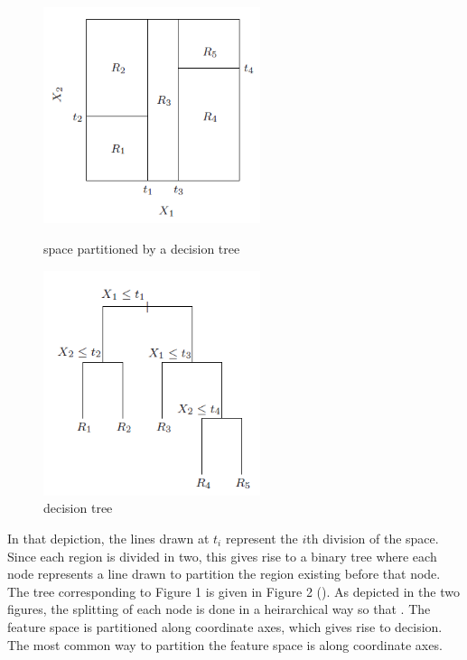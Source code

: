 \documentclass[12pt]{article}
\begin{document}
\begin{figure}[b!]
\centering
\begin{minipage}{0.45\textwidth}
\centering
\includegraphics[width=2.5in]{partition}
\caption{space partitioned by a decision tree}
\end{minipage}\hfill
\begin{minipage}{0.45\textwidth}
\centering
\includegraphics[width=2.5in]{dectree}
\caption{decision tree}
\end{minipage}
\end{figure}

 In that depiction, the lines drawn at $t_i$ represent the $i$th division of the space. Since each region is divided in two, this gives rise to a binary tree where each node represents a line drawn to partition the region existing before that node. The tree corresponding to Figure 1 is given in Figure 2 (\cite{HTF}). As depicted in the two figures, the splitting of each node is done in a heirarchical way so that . The feature space is partitioned along coordinate axes, which gives rise to decision. The most common way to partition the feature space is along coordinate axes. 
\end{document}
